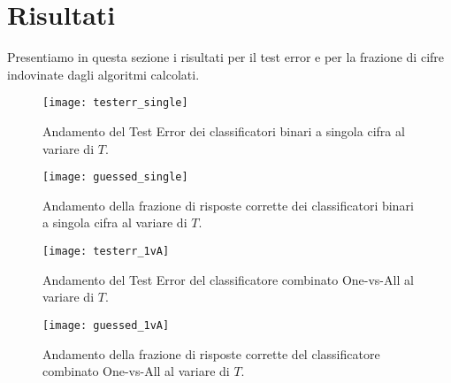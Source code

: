 
\section{Risultati}
Presentiamo in questa sezione i risultati per il test error e per la frazione di cifre indovinate dagli algoritmi calcolati.

\begin{figure}[h]
\centering
\texttt{[image: testerr\_single]}
\caption{Andamento del Test Error dei classificatori binari a singola cifra al variare di $T$.}

\texttt{[image: guessed\_single]}
\caption{Andamento della frazione di risposte corrette dei classificatori binari a singola cifra al variare di $T$.}
\label{fig:single}
\end{figure}

\begin{figure}[h]
\centering
\texttt{[image: testerr\_1vA]}
\caption{Andamento del Test Error del classificatore combinato One-vs-All al variare di $T$.}

\texttt{[image: guessed\_1vA]}
\caption{Andamento della frazione di risposte corrette del classificatore combinato One-vs-All al variare di $T$.}
\label{fig:1vA}
\end{figure}